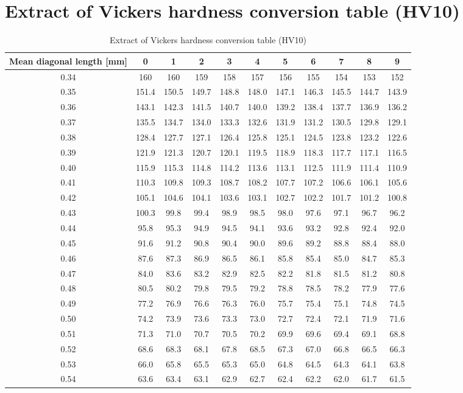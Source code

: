 
\chapter{Extract of Vickers hardness conversion table (HV10)} %

\label{AppendixB} %

\begin{center}
\begin{table}[ht]
\begin{tabular}{|c|c |c |c| c|c|c|c|c|c|c|}
    \hline
    Mean diagonal length [mm] & 0 &1&2&3&4&5&6&7&8&9\\
\hline 
\hline   
    0.34 & 160 &160&159&158&157&156&155&154&153&152\\
    0.35&151.4&150.5&149.7&148.8&148.0&147.1&146.3&145.5&144.7&143.9\\ 
    0.36&143.1&142.3&141.5&140.7&140.0&139.2&138.4&137.7&136.9&136.2\\
    0.37&135.5&134.7&134.0&133.3&132.6&131.9&131.2&130.5&129.8&129.1\\
    0.38&128.4&127.7&127.1&126.4&125.8&125.1&124.5&123.8&123.2&122.6\\
    0.39&121.9&121.3&120.7&120.1&119.5&118.9&118.3&117.7&117.1&116.5\\
    0.40&115.9&115.3&114.8&114.2&113.6&113.1&112.5&111.9&111.4&110.9\\
    0.41&110.3&109.8&109.3&108.7&108.2&107.7&107.2&106.6&106.1&105.6\\
    0.42&105.1&104.6&104.1&103.6&103.1&102.7&102.2&101.7&101.2&100.8\\
    0.43&100.3&99.8&99.4&98.9&98.5&98.0&97.6&97.1&96.7&96.2\\
    0.44&95.8&95.3&94.9&94.5&94.1&93.6&93.2&92.8&92.4&92.0\\
    0.45&91.6&91.2&90.8&90.4&90.0&89.6&89.2&88.8&88.4&88.0\\
    0.46&87.6&87.3&86.9&86.5&86.1&85.8&85.4&85.0&84.7&85.3\\
    0.47&84.0&83.6&83.2&82.9&82.5&82.2&81.8&81.5&81.2&80.8\\
    0.48&80.5&80.2&79.8&79.5&79.2&78.8&78.5&78.2&77.9&77.6\\
    0.49&77.2&76.9&76.6&76.3&76.0&75.7&75.4&75.1&74.8&74.5\\
    0.50&74.2&73.9&73.6&73.3&73.0&72.7&72.4&72.1&71.9&71.6\\
    0.51&71.3&71.0&70.7&70.5&70.2&69.9&69.6&69.4&69.1&68.8\\
    0.52&68.6&68.3&68.1&67.8&68.5&67.3&67.0&66.8&66.5&66.3\\
    0.53&66.0&65.8&65.5&65.3&65.0&64.8&64.5&64.3&64.1&63.8\\
    0.54&63.6&63.4&63.1&62.9&62.7&62.4&62.2&62.0&61.7&61.5\\    \hline
\end{tabular}

\caption[Extract of Vickers hardness conversion table (HV10)]{Extract of Vickers hardness conversion table (HV10)}
\label{tab:compo}
\end{table}
 \end{center}
